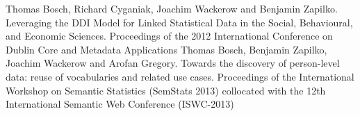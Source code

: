 \documentclass{llncs}
\begin{document}
%
\begin{thebibliography}{1}
Thomas Bosch, Richard Cyganiak, Joachim Wackerow and Benjamin Zapilko. Leveraging the {DDI} Model for Linked Statistical Data in the Social, Behavioural, and Economic Sciences. Proceedings of the 2012 International Conference on Dublin Core and 	Metadata Applications
Thomas Bosch, Benjamin Zapilko, Joachim Wackerow and Arofan Gregory. Towards the discovery of person-level data: reuse of vocabularies and related use cases. Proceedings of the International Workshop on Semantic Statistics (SemStats 2013) collocated with the 12th International Semantic Web Conference (ISWC-2013)
\end{thebibliography}
\end{document}
